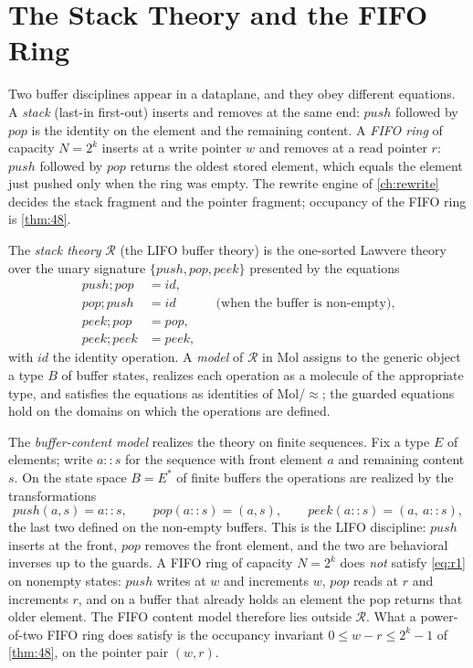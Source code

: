 \section{The Stack Theory and the FIFO Ring}\label{sec:lawvere-ring}

Two buffer disciplines appear in a dataplane, and they obey different
equations. A \emph{stack} (last-in first-out) inserts and removes at the
same end: $\mathit{push}$ followed by $\mathit{pop}$ is the identity on
the element and the remaining content. A \emph{FIFO ring} of capacity
$N = 2^{k}$ inserts at a write pointer $w$ and removes at a read
pointer $r$: $\mathit{push}$ followed by $\mathit{pop}$ returns the
oldest stored element, which equals the element just pushed only when
the ring was empty. The rewrite engine of \autoref{ch:rewrite} decides
the stack fragment and the pointer fragment; occupancy of the FIFO ring
is \autoref{thm:48}.

\begin{definition}
\label{def:ring-theory}
The \emph{stack theory} $\mathcal{R}$ (the LIFO buffer theory) is the
one-sorted Lawvere theory over the unary signature
$\{\mathit{push}, \mathit{pop}, \mathit{peek}\}$ presented by the equations
\begin{align}
\mathit{push};\mathit{pop} &= \mathit{id}, \label{eq:r1}\\
\mathit{pop};\mathit{push} &= \mathit{id} &&\text{(when the buffer is
non-empty)}, \label{eq:r2}\\
\mathit{peek};\mathit{pop} &= \mathit{pop}, \label{eq:r3}\\
\mathit{peek};\mathit{peek} &= \mathit{peek}, \label{eq:r4}
\end{align}
with $\mathit{id}$ the identity operation. A \emph{model} of $\mathcal{R}$
in Mol assigns to the generic object a type $B$ of buffer states, realizes
each operation as a molecule of the appropriate type, and satisfies the
equations as identities of Mol/$\approx$; the guarded equations hold on the
domains on which the operations are defined.
\end{definition}

The \emph{buffer-content model} realizes the theory on finite sequences.
Fix a type $E$ of elements; write $a \mathbin{::} s$ for the sequence with
front element $a$ and remaining content $s$. On the state space
$B = E^{*}$ of finite buffers the operations are realized by the
transformations
\[
\mathit{push} (a,s) = a \mathbin{::} s, \qquad
\mathit{pop} (a \mathbin{::} s) = (a,s), \qquad
\mathit{peek} (a \mathbin{::} s) = (a,\ a \mathbin{::} s),
\]
the last two defined on the non-empty buffers. This is the LIFO
discipline: $\mathit{push}$ inserts at the front, $\mathit{pop}$ removes
the front element, and the two are behavioral inverses up to the guards.
A FIFO ring of capacity $N = 2^{k}$ does \emph{not} satisfy
\eqref{eq:r1} on nonempty states: $\mathit{push}$ writes at $w$ and
increments $w$, $\mathit{pop}$ reads at $r$ and increments $r$, and on a
buffer that already holds an element the pop returns that older element.
The FIFO content model therefore lies outside $\mathcal{R}$. What a
power-of-two FIFO ring does satisfy is the occupancy invariant
$0 \leq w - r \leq 2^{k} - 1$ of \autoref{thm:48}, on the pointer pair
$(w, r)$.

